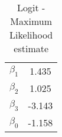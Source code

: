 \begin{table}[htb]
\centering
\caption{Logit - Maximum Likelihood estimate}\label{tab:mv}
\begin{tabular}{lc}
 \hline 
$\beta_1$ & 1.435 \\ 
$\beta_2$ & 1.025 \\ 
$\beta_3$ & -3.143 \\ 
$\beta_0$ & -1.158 \\ 
\hline
\end{tabular}
\end{table}

